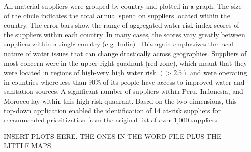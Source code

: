 \documentclass[a4paper]{article}
\begin{document}
All material suppliers were grouped by country and plotted in a graph. 
The size of the circle indicates the total annual spend on suppliers located within the country. 
The error bars show the range of aggregated water risk index scores of the suppliers within each country.
 In many cases, the scores vary greatly between suppliers within a single country (e.g. India). 
 This again emphasizes the local nature of water issues that can change drastically across geographies.
 Suppliers of most concern were in the upper right quadrant (red zone), which meant that they were located in regions of high-very high water risk $(>2.5)$ and were operating in countries where less than 90\% of its people have access to improved water and sanitation sources. 
 A significant number of suppliers within Peru, Indonesia, and Morocco lay within this high risk quadrant. 
 Based on the two dimensions, this top-down application enabled the identification of 14 at-risk suppliers for recommended prioritization from the original list of over 1,000 suppliers.

INSERT PLOTS HERE. THE ONES IN THE WORD FILE PLUS THE LITTLE MAPS.
\end{document}
